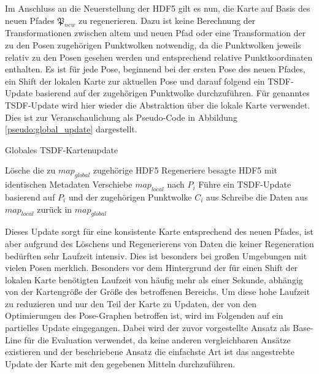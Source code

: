 
Im Anschluss an die Neuerstellung der HDF5 gilt es nun, die Karte auf Basis des neuen Pfades $\mathfrak{P}_{new}$ zu regenerieren. Dazu ist keine Berechnung der Transformationen zwischen altem und neuen Pfad oder eine Transformation der zu den Posen zugehörigen Punktwolken notwendig, da die Punktwolken jeweils relativ zu den Posen gesehen werden und entsprechend relative Punktkoordinaten enthalten. Es ist für jede Pose, beginnend bei der ersten Pose des neuen Pfades, ein Shift der lokalen Karte zur aktuellen Pose und darauf folgend ein TSDF-Update basierend auf der zugehörigen Punktwolke durchzuführen. Für genanntes TSDF-Update wird hier wieder die Abstraktion über die lokale Karte verwendet. Dies ist zur Veranschaulichung als Pseudo-Code in Abbildung \ref{pseudo:global_update} dargestellt.

\begin{algorithm}[H]
\caption{Globales TSDF-Kartenupdate} \label{pseudo:global_update}
\begin{algorithmic}[1]
	\State Lösche die zu $map_{global}$ zugehörige HDF5
	\State Regeneriere besagte HDF5 mit identischen Metadaten
		\State Verschiebe $map_{local}$ nach $P_i$
		\State Führe ein TSDF-Update basierend auf $P_i$ und der zugehörigen Punktwolke $C_i$ aus
		\State Schreibe die Daten aus $map_{local}$ zurück in $map_{global}$
	\EndFor
\EndProcedure
\end{algorithmic}
\end{algorithm}

Dieses Update sorgt für eine konsistente Karte entsprechend des neuen Pfades, ist aber aufgrund des Löschens und Regenerierens von Daten die keiner Regeneration bedürften sehr Laufzeit intensiv. Dies ist besonders bei großen Umgebungen mit vielen Posen merklich. Besonders vor dem Hintergrund der für einen Shift der lokalen Karte benötigten Laufzeit von häufig mehr als einer Sekunde, abhängig von der Kartengröße der Größe des betroffenen Bereichs. Um diese hohe Laufzeit zu reduzieren und nur den Teil der Karte zu Updaten, der von den Optimierungen des Pose-Graphen betroffen ist, wird im Folgenden auf ein partielles Update eingegangen. Dabei wird der zuvor vorgestellte Ansatz als Base-Line für die Evaluation verwendet, da keine anderen vergleichbaren Ansätze existieren und der beschriebene Ansatz die einfachste Art ist das angestrebte Update der Karte mit den gegebenen Mitteln durchzuführen.


